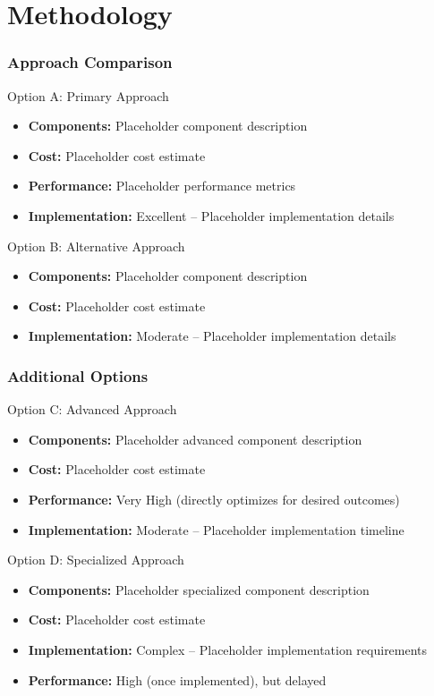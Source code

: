 \section{Methodology}\label{sec:methodology}

\begin{frame}
\frametitle{Approach Comparison}
\begin{block}{Option A: Primary Approach}
\begin{itemize}
\item \textbf{Components:} Placeholder component description
\item \textbf{Cost:} Placeholder cost estimate
\item \textbf{Performance:} Placeholder performance metrics
\item \textbf{Implementation:} \textcolor{mygreen}{Excellent} -- Placeholder implementation details
\end{itemize}
\end{block}

\begin{block}{Option B: Alternative Approach}
\begin{itemize}
\item \textbf{Components:} Placeholder component description
\item \textbf{Cost:} Placeholder cost estimate
\item \textbf{Implementation:} \textcolor{myorange}{Moderate} -- Placeholder implementation details
\end{itemize}
\end{block}
\end{frame}

\begin{frame}
\frametitle{Additional Options}
\begin{block}{Option C: Advanced Approach}
\begin{itemize}
\item \textbf{Components:} Placeholder advanced component description
\item \textbf{Cost:} Placeholder cost estimate
\item \textbf{Performance:} \textcolor{mygreen}{Very High} (directly optimizes for desired outcomes)
\item \textbf{Implementation:} \textcolor{myorange}{Moderate} -- Placeholder implementation timeline
\end{itemize}
\end{block}

\begin{block}{Option D: Specialized Approach}
\begin{itemize}
\item \textbf{Components:} Placeholder specialized component description
\item \textbf{Cost:} Placeholder cost estimate
\item \textbf{Implementation:} \textcolor{myred}{Complex} -- Placeholder implementation requirements
\item \textbf{Performance:} High (once implemented), but delayed
\end{itemize}
\end{block}
\end{frame}

